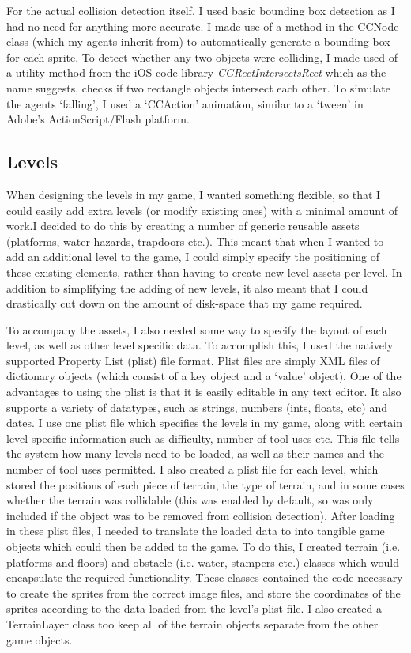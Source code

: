 \documentclass[a4paper,oneside]{report}
\begin{document}
For the actual collision detection itself, I used basic bounding box detection as I had no need for anything more accurate. I made use of a method in the CCNode class (which my agents inherit from) to automatically generate a bounding box for each sprite. To detect whether any two objects were colliding, I made used of a utility method from the iOS code library \emph{CGRectIntersectsRect} which as the name suggests, checks if two rectangle objects intersect each other. To simulate the agents `falling', I used a `CCAction' animation, similar to a `tween' in Adobe's ActionScript/Flash platform. 

\subsection{Levels} 

When designing the levels in my game, I wanted something flexible, so that I could easily add extra levels (or modify existing ones) with a minimal amount of work.I decided to do this by creating a number of generic reusable assets (platforms, water hazards, trapdoors etc.). This meant that when I wanted to add an additional level to the game, I could simply specify the positioning of these existing elements, rather than having to create new level assets per level. In addition to simplifying the adding of new levels, it also meant that I could drastically cut down on the amount of disk-space that my game required.

To accompany the assets, I also needed some way to specify the layout of each level, as well as other level specific data. To accomplish this, I used the natively supported Property List (plist) file format. Plist files are simply XML files of dictionary objects (which consist of a key object and a `value' object). One of the advantages to using the plist is that it is easily editable in any text editor. It also supports a variety of datatypes, such as strings, numbers (ints, floats, etc) and dates. I use one plist file which specifies the levels in my game, along with certain level-specific information such as difficulty, number of tool uses etc. This file tells the system how many levels need to be loaded, as well as their names and the number of tool uses permitted. I also created a plist file for each level, which stored the positions of each piece of terrain, the type of terrain, and in some cases whether the terrain was collidable (this was enabled by default, so was only included if the object was to be removed from collision detection). After loading in these plist files, I needed to translate the loaded data to into tangible game objects which could then be added to the game. To do this, I created terrain (i.e. platforms and floors) and obstacle (i.e. water, stampers etc.) classes which would encapsulate the required functionality. These classes contained the code necessary to create the sprites from the correct image files, and store the coordinates of the sprites according to the data loaded from the level's plist file. I also created a TerrainLayer class too keep all of the terrain objects separate from the other game objects.
\end{document}
